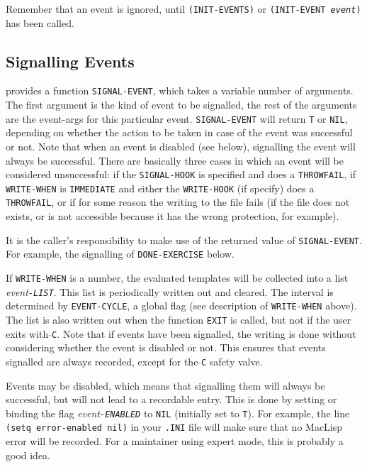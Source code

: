 Remember that an event is ignored, until {\tt (INIT-EVENTS)} or {\tt (INIT-EVENT
{\it event})} has been called.

\subsection{Signalling Events}

\TPS provides a function {\tt SIGNAL-EVENT}, which takes a variable number
of arguments.  The first argument is the kind of event to be signalled,
the rest of the arguments are the event-args for this particular event.
{\tt SIGNAL-EVENT} will return {\tt T} or {\tt NIL}, depending on whether the action
to be taken in case of the event was successful or not.  Note that when
an event is disabled (see below), signalling the event will always be
successful.  There are basically three cases in which an event will be
considered unsuccessful: if the {\tt SIGNAL-HOOK} is specified and does a
{\tt THROWFAIL}, if {\tt WRITE-WHEN} is {\tt IMMEDIATE} and either the {\tt WRITE-HOOK}
(if specify) does a {\tt THROWFAIL}, or if for some reason the writing to
the file fails (if the file does not exists, or is not accessible
because it has the wrong protection, for example).

It is the caller's responsibility to make use of the returned value of
{\tt SIGNAL-EVENT}.  For example, the signalling of {\tt DONE-EXERCISE} below.

If {\tt WRITE-WHEN} is a number, the evaluated templates will be collected
into a list {\it event{\tt -LIST}}.  This list is periodically written out and
cleared.  The interval is determined by {\tt EVENT-CYCLE}, a global flag
(see description of {\tt WRITE-WHEN} above).  The list is also written out
when the function {\tt EXIT} is called, but not if the user exits \TPS with
{\tt $\hat{}$C}.  Note that if events have been signalled, the writing is done
without considering whether the event is disabled or not.  This ensures
that events signalled are always recorded, except for the {\tt $\hat{}$C} safety valve.

Events may be disabled, which means that signalling them will always
be successful, but will not lead to a recordable entry.  This is done
by setting or binding the flag {\it event{\tt -ENABLED}} to {\tt NIL} (initially
set to {\tt T}).  For example, the line {\tt (setq error-enabled nil)} 
in your {\tt .INI} file will make sure that no MacLisp error will be recorded.
For a maintainer using expert mode, this is probably a good idea.

